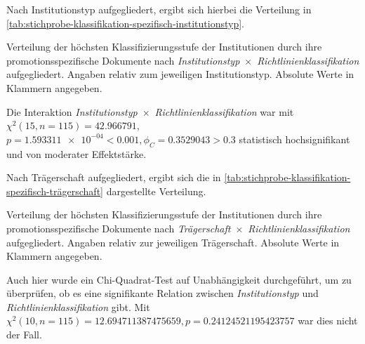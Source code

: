 Nach Institutionstyp aufgegliedert, ergibt sich hierbei die Verteilung in \cref{tab:stichprobe-klassifikation-spezifisch-institutionstyp}.
\begin{table}[!htbp]
	\caption{Verteilung der höchsten Klassifizierungsstufe der Institutionen durch ihre promotionsspezifische Dokumente nach \textit{Institutionstyp}~$\times$~\textit{Richtlinienklassifikation} aufgegliedert.
    Angaben relativ zum jeweiligen Institutionstyp.
    Absolute Werte in Klammern angegeben.}
    
	\label{tab:stichprobe-klassifikation-spezifisch-institutionstyp}
\end{table}

\noindent Die Interaktion \textit{Institutionstyp}~$\times$~\textit{Richtlinienklassifikation} war mit $\chi^2 (\num{15}, n=\num{115}) = \num[round-mode=places,round-precision=2]{42,966791}$, $p = \num[round-mode=places,round-precision=2]{1,593311e-04}<\num{0.001}, \phi_C=\num[round-mode=places,round-precision=2]{0.3529043}>\num{0.3}$ statistisch hochsignifikant und von moderater Effektstärke.

Nach Trägerschaft aufgegliedert, ergibt sich die in \cref{tab:stichprobe-klassifikation-spezifisch-trägerschaft} dargestellte Verteilung.
\begin{table}[!htbp]
	\caption{Verteilung der höchsten Klassifizierungsstufe der Institutionen durch ihre promotionsspezifische Dokumente nach \textit{Trägerschaft}~$\times$~\textit{Richtlinienklassifikation} aufgegliedert.
    Angaben relativ zur jeweiligen Trägerschaft.
    Absolute Werte in Klammern angegeben.}
    
	\label{tab:stichprobe-klassifikation-spezifisch-trägerschaft}
\end{table}

\noindent Auch hier wurde ein Chi-Quadrat-Test auf Unabhängigkeit durchgeführt, um zu überprüfen, ob es eine signifikante Relation zwischen \textit{Institutionstyp} und \textit{Richtlinienklassifikation} gibt.
Mit $\chi^2 (\num{10}, n=\num{115}) = \num[round-mode=places,round-precision=2]{12,694711387475659}, p = \num[round-mode=places,round-precision=2]{0,24124521195423757}$ war dies nicht der Fall.

